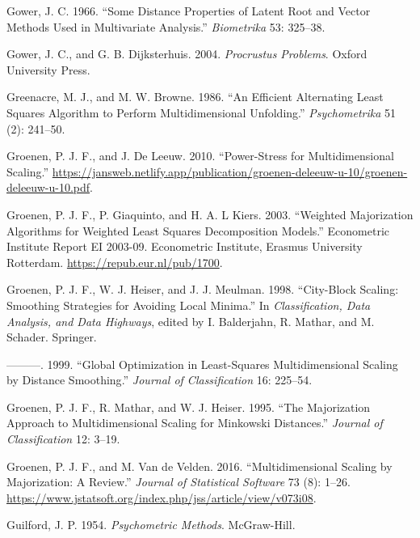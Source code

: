 \documentclass[
  12pt,
  letterpaper,
  DIV=11,
  numbers=noendperiod]{scrreprt}
\newlength{\cslhangindent}
\newenvironment{CSLReferences}[2] %
 {\begin{list}{}{%
  \setlength{\itemindent}{0pt}
  \setlength{\leftmargin}{0pt}
  \setlength{\parsep}{0pt}
  \ifodd #1
   \setlength{\leftmargin}{\cslhangindent}
   \setlength{\itemindent}{-1\cslhangindent}
  \fi
  \setlength{\itemsep}{#2\baselineskip}}}
 {\end{list}}
\theoremstyle{remark}
\begin{document}
\begin{CSLReferences}{1}{0}
Gower, J. C. 1966. {``{Some Distance Properties of Latent Root and
Vector Methods Used in Multivariate Analysis}.''} \emph{Biometrika} 53:
325--38.

Gower, J. C., and G. B. Dijksterhuis. 2004. \emph{Procrustus Problems}.
Oxford University Press.

Greenacre, M. J., and M. W. Browne. 1986. {``{An Efficient Alternating
Least Squares Algorithm to Perform Multidimensional Unfolding}.''}
\emph{Psychometrika} 51 (2): 241--50.

Groenen, P. J. F., and J. De Leeuw. 2010. {``{Power-Stress for
Multidimensional Scaling}.''}
\url{https://jansweb.netlify.app/publication/groenen-deleeuw-u-10/groenen-deleeuw-u-10.pdf}.

Groenen, P. J. F., P. Giaquinto, and H. A. L Kiers. 2003. {``{Weighted
Majorization Algorithms for Weighted Least Squares Decomposition
Models}.''} Econometric Institute Report EI 2003-09. Econometric
Institute, Erasmus University Rotterdam.
\url{https://repub.eur.nl/pub/1700}.

Groenen, P. J. F., W. J. Heiser, and J. J. Meulman. 1998. {``{City-Block
Scaling: Smoothing Strategies for Avoiding Local Minima}.''} In
\emph{Classification, Data Analysis, and Data Highways}, edited by I.
Balderjahn, R. Mathar, and M. Schader. Springer.

---------. 1999. {``{Global Optimization in Least-Squares
Multidimensional Scaling by Distance Smoothing}.''} \emph{Journal of
Classification} 16: 225--54.

Groenen, P. J. F., R. Mathar, and W. J. Heiser. 1995. {``{The
Majorization Approach to Multidimensional Scaling for Minkowski
Distances}.''} \emph{Journal of Classification} 12: 3--19.

Groenen, P. J. F., and M. Van de Velden. 2016. {``{Multidimensional
Scaling by Majorization: A Review}.''} \emph{Journal of Statistical
Software} 73 (8): 1--26.
\url{https://www.jstatsoft.org/index.php/jss/article/view/v073i08}.

Guilford, J. P. 1954. \emph{Psychometric Methods}. McGraw-Hill.


\end{CSLReferences}
\end{document}
